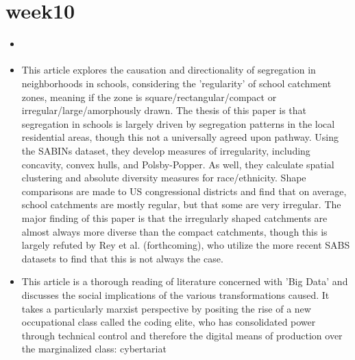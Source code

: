 \documentclass{article} \usepackage{filecontents}
\begin{document}
\section{week10}
\begin{itemize}
\item \cite{saporito2016IrregularlyShaped}
\item This article explores the causation and directionality of
  segregation in neighborhoods in schools, considering the
  'regularity' of school catchment zones, meaning if the zone is
  square/rectangular/compact or irregular/large/amorphously drawn. The
  thesis of this paper is that segregation in schools is largely
  driven by segregation patterns in the local residential areas,
  though this not a universally agreed upon pathway. Using the SABINs
  dataset, they develop measures of irregularity, including concavity,
  convex hulls, and Polsby-Popper. As well, they calculate spatial
  clustering and absolute diversity measures for race/ethnicity. Shape
  comparisons are made to US congressional districts and find that on
  average, school catchments are mostly regular, but that some are
  very irregular. The major finding of this paper is that the
  irregularly shaped catchments are almost always more diverse than
  the compact catchments, though this is largely refuted by Rey et
  al. (forthcoming), who utilize the more recent SABS datasets to find
  that this is not always the case.


\item \cite{burrell2021SocietyAlgorithms} This article is a thorough
  reading of literature concerned with 'Big Data' and discusses the
  social implications of the various transformations caused. It takes
  a particularly marxist perspective by positing the rise of a new
  occupational class called the coding elite, who has consolidated
  power through technical control and therefore the digital means of
  production over the marginalized class: cybertariat
  

\end{itemize}
\end{document}
